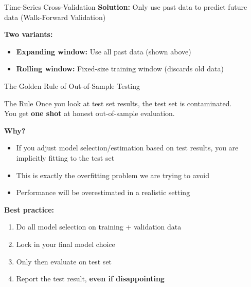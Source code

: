 \documentclass[10pt]{beamer}
\newcommand{\highlight}[1]{\textcolor{AccentOrange}{\textbf{#1}}}
\newcommand{\good}[1]{\textcolor{AccentGreen}{#1}}
\begin{document}
\begin{frame}{Time-Series Cross-Validation}
  \textbf{Solution:} Only use past data to predict future data (Walk-Forward Validation)
  
  \vspace{0.5em}
  \begin{center}
  \end{center}
  
  \vspace{0.3em}
  \textbf{Two variants:}
  \begin{itemize}
    \item \textbf{Expanding window:} Use all past data (shown above)
    \item \textbf{Rolling window:} Fixed-size training window (discards old data)
  \end{itemize}
\end{frame}


\begin{frame}{The Golden Rule of Out-of-Sample Testing}
  \begin{block}{The Rule}
    \centering
    Once you look at test set results, the test set is contaminated.\\
    You get \textbf{one shot} at honest out-of-sample evaluation.
  \end{block}
  
  \vspace{0.5em}
  \textbf{Why?}
  \begin{itemize}
    \item If you adjust model selection/estimation based on test results, you are implicitly fitting to the test set
    \item This is exactly the overfitting problem we are trying to avoid
    \item Performance will be overestimated in a realistic setting
  \end{itemize}
  
  \vspace{0.5em}
  \textbf{Best practice:}
  \begin{enumerate}
    \item Do all model selection on training + validation data
    \item Lock in your final model choice
    \item Only then evaluate on test set
    \item Report the test result, \highlight{even if disappointing}
  \end{enumerate}
\end{frame}
\end{document}
